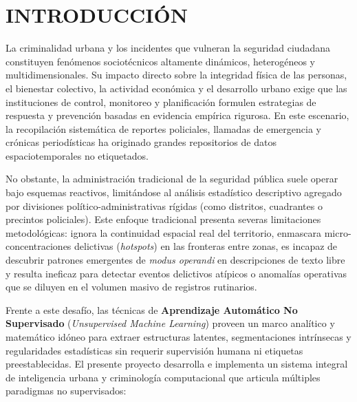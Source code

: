 \section{INTRODUCCIÓN}

La criminalidad urbana y los incidentes que vulneran la seguridad ciudadana constituyen fenómenos sociotécnicos altamente dinámicos, heterogéneos y multidimensionales. Su impacto directo sobre la integridad física de las personas, el bienestar colectivo, la actividad económica y el desarrollo urbano exige que las instituciones de control, monitoreo y planificación formulen estrategias de respuesta y prevención basadas en evidencia empírica rigurosa. En este escenario, la recopilación sistemática de reportes policiales, llamadas de emergencia y crónicas periodísticas ha originado grandes repositorios de datos espaciotemporales no etiquetados.

No obstante, la administración tradicional de la seguridad pública suele operar bajo esquemas reactivos, limitándose al análisis estadístico descriptivo agregado por divisiones político-administrativas rígidas (como distritos, cuadrantes o precintos policiales). Este enfoque tradicional presenta severas limitaciones metodológicas: ignora la continuidad espacial real del territorio, enmascara micro-concentraciones delictivas (\textit{hotspots}) en las fronteras entre zonas, es incapaz de descubrir patrones emergentes de \textit{modus operandi} en descripciones de texto libre y resulta ineficaz para detectar eventos delictivos atípicos o anomalías operativas que se diluyen en el volumen masivo de registros rutinarios.

Frente a este desafío, las técnicas de \textbf{Aprendizaje Automático No Supervisado} (\textit{Unsupervised Machine Learning}) proveen un marco analítico y matemático idóneo para extraer estructuras latentes, segmentaciones intrínsecas y regularidades estadísticas sin requerir supervisión humana ni etiquetas preestablecidas. El presente proyecto desarrolla e implementa un sistema integral de inteligencia urbana y criminología computacional que articula múltiples paradigmas no supervisados:

